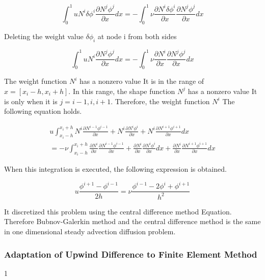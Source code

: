 \begin{equation}
{\int^1_0}u{N^i\delta\phi^i}\frac{\partial N^j\phi^j}{\partial x}dx = -{\int^1_0}\nu\frac{\partial N^i\delta\phi^i}{\partial x}\frac{\partial N^j\phi^j}{\partial x}dx
\end{equation}

Deleting the weight value $\delta\phi_i$ at node i from both sides

\begin{equation}
{\int^1_0}u{N^i}\frac{\partial N^j\phi^j}{\partial x}dx = -{\int^1_0}\nu\frac{\partial N^i}{\partial x}\frac{\partial N^j\phi^j}{\partial x}dx
\end{equation}

The weight function $N^i$ has a nonzero value
It is in the range of $x=[x_i-h,x_i+h]$.
In this range, the shape function $N^j$ has a nonzero value
It is only when it is $j=i-1,i,i+1$. Therefore, the weight function $N^i$
The following equation holds.

\begin{eqnarray}
u{\int^{x_i+h}_{x_i-h}}  {N^i}\frac{\partial N^{i-1}\phi^{i-1}}{\partial x} + {N^i}\frac{\partial N^i\phi^i}{\partial x} + {N^i}\frac{\partial N^{i+1}\phi^{i+1}}{\partial x}dx\\ = -\nu{\int^{x_i+h}_{x_i-h}}  \frac{\partial N^i}{\partial x}\frac{\partial N^{i-1}\phi^{i-1}}{\partial x} + \frac{\partial N^i}{\partial x}\frac{\partial N^i\phi^i}{\partial x}dx + \frac{\partial N^i}{\partial x}\frac{\partial N^{i+1}\phi^{i+1}}{\partial x}dx
\end{eqnarray}

When this integration is executed, the following expression is obtained.

\begin{equation}
u\frac{\phi^{i+1}-\phi^{i-1}}{2h} = \nu\frac{\phi^{i-1}-2\phi^i+\phi^{i+1}}{h^2}
\end{equation}

It discretized this problem using the central difference method Equation.
%
Therefore Bubnov-Galerkin method and the central difference method is the same in one dimensional steady advection diffusion problem.






\subsubsection{Adaptation of Upwind Difference to Finite Element Method}1


